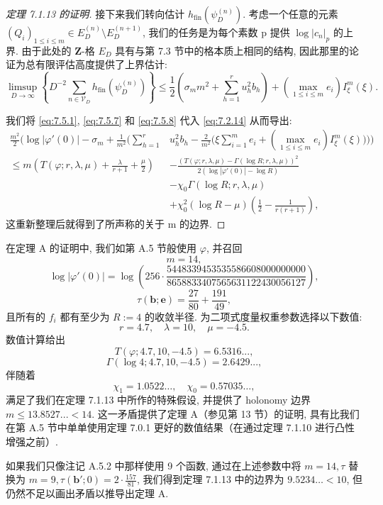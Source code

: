 \begin{proof}[定理 7.1.13 的证明]
接下来我们转向估计 \(h_{\text{fin}}(\psi_D^{(n)})\). 
考虑一个任意的元素 \((Q_i)_{1 \leq i \leq m} \in E_D^{(n)} \setminus E_D^{(n+1)}\), 
我们的任务是为每个素数 p 提供 \(\log |c_n|_p\) 的上界. 
由于此处的 \(\mathbf{Z}\)-格 \(E_D\) 具有与第 7.3 节中的格本质上相同的结构, 
因此那里的论证为总有限评估高度提供了上界估计:
\begin{equation}\label{eq:7.5.8}
\limsup_{D \to \infty} \left\{ D^{-2} \sum_{n \in \mathcal{V}_D} h_{\text{fin}}(\psi_D^{(n)}) \right\} \le \frac{1}{2} \left( \sigma_m m^2 + \sum_{h=1}^r u_h^2 b_h \right) + \left( \max_{1 \le i \le m} e_i \right) I_{\xi}^m(\xi).
\end{equation}

我们将 \eqref{eq:7.5.1}, \eqref{eq:7.5.7} 和 \eqref{eq:7.5.8} 代入 \eqref{eq:7.2.14} 从而导出:
\[
\begin{aligned}
\frac{m^2}{2} \Bigg( \log |\varphi'(0)| - \sigma_m + \frac{1}{m^2} \bigg( \sum_{h=1}^r &u_h^2 b_h - \frac{2}{m^2} \Big(\xi \sum_{i=1}^m e_i + \left( \max_{1 \le i \le m} e_i \right) I_{\xi}^m(\xi)\Big) \bigg) \Bigg) \\
\leq m \left( T(\varphi; r, \lambda, \mu) + \frac{\lambda}{r+1} + \frac{\mu}{2} \right) &- \frac{(T(\varphi; r, \lambda, \mu) - \Gamma(\log R; r, \lambda, \mu))^2}{2(\log |\varphi'(0)| - \log R)} \\
&- \chi_0 \Gamma(\log R; r, \lambda, \mu) \\
&+ \chi_0^2 (\log R - \mu) \left( \frac{1}{2} - \frac{1}{r(r+1)} \right),
\end{aligned}
\]
这重新整理后就得到了所声称的关于 m 的边界.
\end{proof}

\begin{example}\label{ex:7.5.9}
在定理 A 的证明中, 我们如第 A.5 节般使用 \(\varphi\), 并召回
\[ m = 14, \]
\[ \log |\varphi'(0)| = \log \left( 256 \cdot \frac{5448339453535586608000000000}{8658833407565631122430056127} \right), \]
\[ \tau(\mathbf{b}; \mathbf{e}) = \frac{27}{80} + \frac{191}{49}, \]
且所有的 \(f_i\) 都有至少为 \(R := 4\) 的收敛半径. 
为二项式度量权重参数选择以下数值:
\[ r = 4.7, \quad \lambda = 10, \quad \mu = -4.5. \]
数值计算给出
\[ T(\varphi; 4.7, 10, -4.5) = 6.5316..., \]
\[ \Gamma(\log 4; 4.7, 10, -4.5) = 2.6429..., \]
伴随着
\[ \chi_1 = 1.0522\dots, \quad \chi_0 = 0.57035\dots, \]
满足了我们在定理 7.1.13 中所作的特殊假设, 并提供了 holonomy 边界 \(m \leq 13.8527... < 14\). 
这一矛盾提供了定理 A（参见第 13 节）的证明, 
具有比我们在第 A.5 节中单单使用定理 7.0.1 更好的数值结果（在通过定理 7.1.10 进行凸性增强之前）.

如果我们只像注记 A.5.2 中那样使用 9 个函数, 
通过在上述参数中将 \(m=14, \tau\) 替换为 \(m=9, \tau(\mathbf{b}';0)=2\cdot\frac{157}{81}\), 
我们得到定理 7.1.13 中的边界为 \(9.5234\ldots<10\), 但仍然不足以画出矛盾以推导出定理 A. \end{example}


